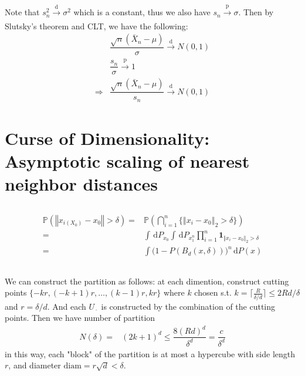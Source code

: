\documentclass[11pt,a4paper]{ctexart}
\numberwithin{equation}{section}%
\begin{document}
\subsection{}

Note that $ s_n^2 \xrightarrow[]{\mathrm{d}} \sigma ^2 $ which is a constant, thus we also have $ s_n \xrightarrow[]{\mathrm{p}} \sigma  $. Then by Slutsky's theorem and CLT, we have the following:
\begin{align*}
    &\dfrac{ \sqrt{n}(\bar{X}_n - \mu ) }{ \sigma } \xrightarrow[]{\mathrm{d}} N(0,1)\\
    &\dfrac{ s_n }{ \sigma } \xrightarrow[]{\mathrm{p}} 1\\
     \Rightarrow & \dfrac{ \sqrt{n}(\bar{X}_n - \mu ) }{ s_n } \xrightarrow[]{\mathrm{d}} N(0,1)
\end{align*}


\section{Curse of Dimensionality: Asymptotic scaling of nearest neighbor distances}

\subsection{}


\begin{align*}
    \mathbb{P}\left( \left\Vert x_{i(X_0)}-x_0 \right\Vert >\delta   \right) =& \mathbb{P}\left( \bigcap_{i=1}^n \{ \left\Vert x_i-x_0 \right\Vert _2 >\delta   \} \right)\\
    =& \int \,\mathrm{d}P_{x_0} \int  \,\mathrm{d}P_{x_1^n} \prod _{i=1}^n \mathbf{1}_{\left\Vert x_i-x_0 \right\Vert _2 >\delta } \\
    =& \int \big( 1- P\left( B_d(x,\delta ) \right)  \big) ^n \,\mathrm{d}P(x)
\end{align*}

\subsection{}


We can construct the partition as follows: at each dimention, construct cutting points $ \{ -kr , (-k+1)r ,\ldots, (k-1)r , kr \} $ where $ k $ chosen s.t. $ k = \lceil \frac{R}{\delta /d} \rceil \leq 2 Rd/\delta  $ and $ r=\delta /d $. And each $ U_{\, \cdot \, }  $ is constructed by the combination of the cutting points. Then we have number of partition 
\begin{align*}
    N(\delta )=& (2k+1)^d \leq \dfrac{ 8(Rd)^d }{ \delta ^d } = \dfrac{ c }{ \delta ^d } 
\end{align*}
in this way, each "block" of the partition is at most a hypercube with side length $ r $, and diameter $ \mathrm{ diam } = r\sqrt{d} < \delta  $.
\end{document}
